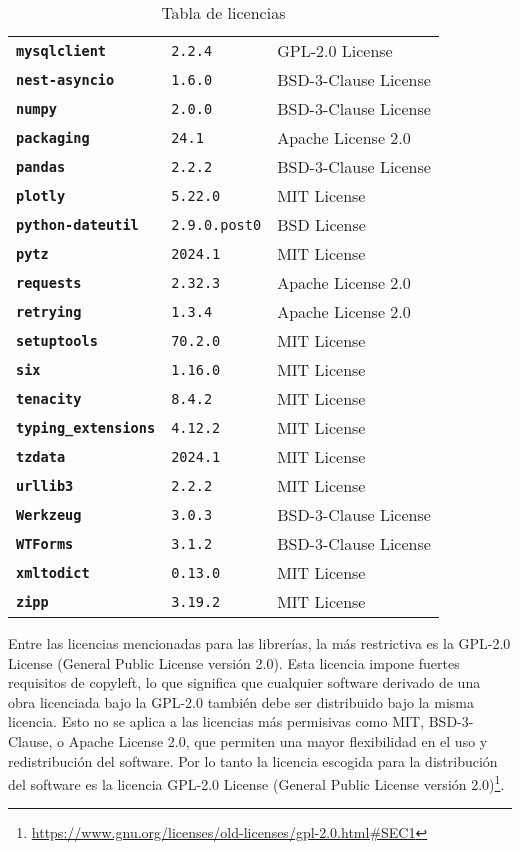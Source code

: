 \begin{table}
{\begin{tabular}{@{}p{14em} p{6em} p{20em}@{}}
            \texttt{\textbf{mysqlclient}} & \texttt{2.2.4} & GPL-2.0 License \\
            \texttt{\textbf{nest-asyncio}} & \texttt{1.6.0} & BSD-3-Clause License \\
            \texttt{\textbf{numpy}} & \texttt{2.0.0} & BSD-3-Clause License \\
            \texttt{\textbf{packaging}} & \texttt{24.1} & Apache License 2.0 \\
            \texttt{\textbf{pandas}} & \texttt{2.2.2} & BSD-3-Clause License \\
            \texttt{\textbf{plotly}} & \texttt{5.22.0} & MIT License \\
            \texttt{\textbf{python-dateutil}} & \texttt{2.9.0.post0} & BSD License \\
            \texttt{\textbf{pytz}} & \texttt{2024.1} & MIT License \\
            \texttt{\textbf{requests}} & \texttt{2.32.3} & Apache License 2.0 \\
            \texttt{\textbf{retrying}} & \texttt{1.3.4} & Apache License 2.0 \\
            \texttt{\textbf{setuptools}} & \texttt{70.2.0} & MIT License \\
            \texttt{\textbf{six}} & \texttt{1.16.0} & MIT License \\
            \texttt{\textbf{tenacity}} & \texttt{8.4.2} & MIT License \\
            \texttt{\textbf{typing\_extensions}} & \texttt{4.12.2} & MIT License \\
            \texttt{\textbf{tzdata}} & \texttt{2024.1} & MIT License \\
            \texttt{\textbf{urllib3}} & \texttt{2.2.2} & MIT License \\
            \texttt{\textbf{Werkzeug}} & \texttt{3.0.3} & BSD-3-Clause License \\
            \texttt{\textbf{WTForms}} & \texttt{3.1.2} & BSD-3-Clause License \\
            \texttt{\textbf{xmltodict}} & \texttt{0.13.0} & MIT License \\
            \texttt{\textbf{zipp}} & \texttt{3.19.2} & MIT License \\
			\bottomrule
		\end{tabular}
	}
	\caption{Tabla de licencias}
    \label{tabla-licencias}
\end{table}

Entre las licencias mencionadas para las librerías, la más restrictiva es la GPL-2.0 License (General Public License versión 2.0). Esta licencia impone fuertes requisitos de copyleft, lo que significa que cualquier software derivado de una obra licenciada bajo la GPL-2.0 también debe ser distribuido bajo la misma licencia. Esto no se aplica a las licencias más permisivas como MIT, BSD-3-Clause, o Apache License 2.0, que permiten una mayor flexibilidad en el uso y redistribución del software.
Por lo tanto la licencia escogida para la distribución del software es la licencia  GPL-2.0 License (General Public License versión 2.0)\footnote{\url{https://www.gnu.org/licenses/old-licenses/gpl-2.0.html#SEC1}}.


